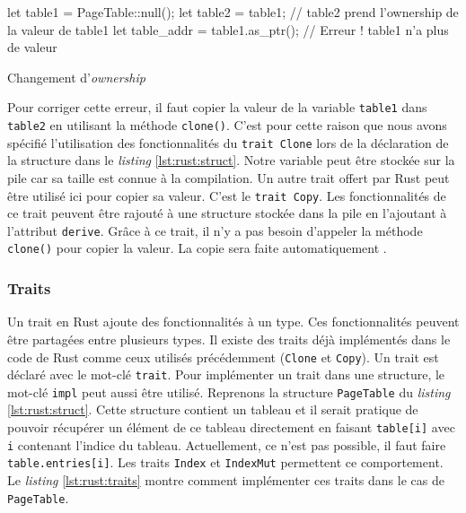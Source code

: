 \begin{code}
\begin{rustcode}
let table1 = PageTable::null();
let table2 = table1;              // table2 prend l'ownership de la valeur de table1
let table_addr = table1.as_ptr(); // Erreur ! table1 n'a plus de valeur
\end{rustcode}
\caption{Changement d'\textit{ownership}}
\label{lst:rust:ownership}
\end{code} \bigbreak

Pour corriger cette erreur, il faut copier la valeur de la variable \texttt{table1}
dans \texttt{table2} en utilisant la méthode \texttt{clone()}.
C'est pour cette raison que nous avons spécifié l'utilisation des fonctionnalités
du \texttt{trait Clone} lors de la déclaration de la structure dans
le \textit{listing} \ref{lst:rust:struct}. Notre variable peut être stockée sur
la pile car sa taille est connue à la compilation. Un autre trait
offert par Rust peut être utilisé ici pour copier sa valeur. C'est le
\texttt{trait Copy}. Les fonctionnalités de ce trait
peuvent être rajouté à une structure stockée dans la pile en l'ajoutant à l'attribut
\texttt{derive}. Grâce à ce trait, il n'y a pas besoin
d'appeler la méthode \texttt{clone()} pour copier la valeur. La copie
sera faite automatiquement \cite{ref2}.

\subsubsection{Traits}
Un trait en Rust ajoute des fonctionnalités à un type.
Ces fonctionnalités peuvent être partagées entre plusieurs types. Il existe des
traits déjà implémentés dans le code de Rust comme ceux
utilisés précédemment (\texttt{Clone} et \texttt{Copy}).
Un trait est déclaré avec le mot-clé \texttt{trait}. Pour implémenter
un trait dans une structure, le mot-clé \texttt{impl} peut aussi
être utilisé. Reprenons la structure \texttt{PageTable} du \textit{listing}
\ref{lst:rust:struct}. Cette structure contient un tableau et il serait pratique
de pouvoir récupérer un élément de ce tableau directement en faisant
\texttt{table[i]} avec \texttt{i} contenant l'indice du tableau.
Actuellement, ce n'est pas possible, il faut faire \texttt{table.entries[i]}.
Les traits \texttt{Index} et \texttt{IndexMut} permettent
ce comportement. Le \textit{listing} \ref{lst:rust:traits} montre comment implémenter
ces traits dans le cas de \texttt{PageTable}.

